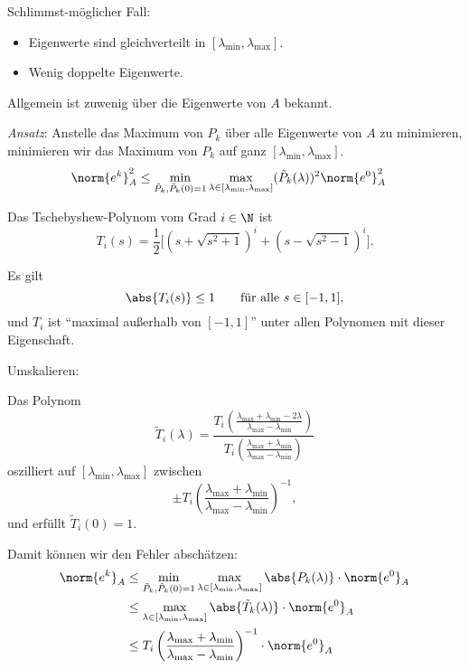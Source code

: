 \begin{bsp}
Schlimmst-möglicher Fall:
\begin{itemize}
	\item Eigenwerte sind gleichverteilt in $\left[\lambda_{\min},\lambda_{\max} \right]$.
	\item Wenig doppelte Eigenwerte.
\end{itemize}

\bigskip

Allgemein ist zuwenig über die Eigenwerte von $A$ bekannt.

\end{bsp}
\emph{Ansatz}: Anstelle das Maximum von $P_k$ über alle Eigenwerte von $A$ zu minimieren,
minimieren wir das Maximum von $P_k$ auf ganz $\left[\lambda_{\min},\lambda_{\max} \right]$.
\begin{align*}
 \norm{e^k}_A^2
  & \leq
 \min_{\tilde{P}_k,\tilde{P}_k(0)=1} \max_{\lambda \in [\lambda_{\min},\lambda_{\max}]}
     (\tilde{P}_k(\lambda ))^2 \norm{e^0}_A^2
\end{align*}
\begin{defi}
Das Tschebyshew-Polynom vom Grad $i \in \N$ ist
\begin{equation*}
 T_i(s)=\frac{1}{2} \Big[ (s+\sqrt{s^2+1})^i + (s-\sqrt{s^2-1} )^i \Big].
\end{equation*}
\end{defi}
\begin{satz}
Es gilt
\begin{equation*}
 \abs{T_i(s)} \leq 1
 \qquad
 \text{für alle $s \in [-1,1]$},
\end{equation*}
und $T_i$ ist "`maximal außerhalb von $[-1,1]$"' unter allen Polynomen mit dieser Eigenschaft.
\end{satz}
Umskalieren:
\begin{lemma}
Das Polynom
\begin{equation*}
 \tilde{T}_i(\lambda)
 =
 \frac{T_i \left( \frac{\lambda_{\max}+\lambda_{\min}-2 \lambda}{\lambda_{\max}-\lambda_{\min}} \right)}{T_i \left(\frac{\lambda_{\max}+\lambda_{\min}}{\lambda_{\max}-\lambda_{\min}} \right)}
\end{equation*}
oszilliert auf $[\lambda_{\min},\lambda_{\max}]$ zwischen
\begin{equation*}
 \pm T_i \left( \frac{\lambda_{\max}+\lambda_{\min}}{\lambda_{\max}-\lambda_{\min}} \right)^{-1},
\end{equation*}
und erfüllt $\tilde{T}_i(0)=1$.
\end{lemma}
Damit können wir den Fehler abschätzen:
\begin{align*}
 \norm{e^k}_A
 & \leq
 \min_{\tilde{P}_k,\tilde{P}_k(0)=1} \max_{\lambda \in [ \lambda_{\min},\lambda_{\max}]}
     \abs{P_k(\lambda)} \cdot \norm{e^0}_A \\
 & \leq
 \max_{\lambda \in [\lambda_{\min},\lambda_{\max}]} \abs{\tilde{T}_k (\lambda)} \cdot \norm{e^0}_A \\
 & \leq
 T_i \left(\frac{\lambda_{\max}+\lambda_{\min}}{\lambda_{\max}-\lambda_{\min}} \right)^{-1} \cdot \norm{e^0}_A
\end{align*}
